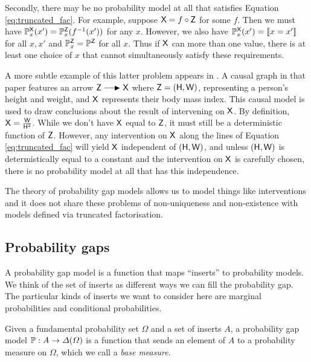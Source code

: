 Secondly, there may be no probability model at all that satisfies Equation \ref{eq:truncated_fac}. For example, suppose $\mathsf{X}=f\circ\mathsf{Z}$ for some $f$. Then we must have $\mathbb{P}^{\mathsf{X}}_x(x')=\mathbb{P}^{\mathsf{Z}}_x(f^{-1}(x'))$ for any $x$. However, we also have $\mathbb{P}^{\mathsf{X}}_x(x')=\llbracket x = x' \rrbracket$ for all $x,x'$ and $\mathbb{P}^{\mathsf{Z}}_x=\mathbb{P}^{\mathsf{Z}}$ for all $x$. Thus if $\mathsf{X}$ can more than one value, there is at least one choice of $x$ that cannot simultaneously satisfy these requirements.

A more subtle example of this latter problem appears in \citet{shahar_association_2009}. A causal graph in that paper features an arrow $\RV{Z}\longrightarrowRHD \RV{X}$ where $\mathsf{Z}=(\mathsf{H},\mathsf{W})$, representing a person's height and weight, and $\mathsf{X}$ represents their body mass index. This causal model is used to draw conclusions about the result of intervening on $\mathsf{X}$. By definition, $\mathsf{X}=\frac{\mathsf{W}}{\mathsf{H}^2}$. While we don't have $\mathsf{X}$ equal to $\mathsf{Z}$, it must still be a deterministic function of $\mathsf{Z}$.  However, any intervention on $\mathsf{X}$ along the lines of Equation \ref{eq:truncated_fac} will yield $\mathsf{X}$ independent of $(\mathsf{H},\mathsf{W})$, and unless $(\mathsf{H},\mathsf{W})$ is determistically equal to a constant and the intervention on $\mathsf{X}$ is carefully chosen, there is no probability model at all that has this independence.

The theory of probability gap models allows us to model things like interventions and it does not share these problems of non-uniqueness and non-existence with models defined via truncated factorisation.

\subsection{Probability gaps}

A probability gap model is a function that maps ``inserts'' to probability models. We think of the set of inserts as different ways we can fill the probability gap. The particular kinds of inserts we want to consider here are marginal probabilities and conditional probabilities.

\begin{definition}
Given a fundamental probability set $\Omega$ and a set of inserts $A$, a probability gap model $\mathbb{P}:A\to \Delta(\Omega)$ is a function that sends an element of $A$ to a probability measure on $\Omega$, which we call a \emph{base measure}.
\end{definition}

